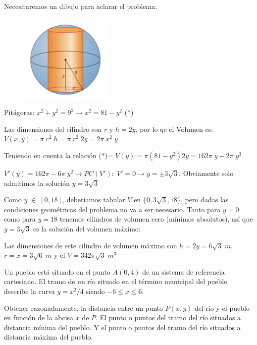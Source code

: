 	\begin{proofw}\renewcommand{\qedsymbol}{$\diamond$}	
		
		Necesitaremos un dibujo para aclarar el problema.

	
	\begin{multicols}{2}
		
		\begin{figure}[H]
			\centering
			\includegraphics[width=0.4\textwidth]{imagenes/imagenes05/T05IM29.png}
		\end{figure}
		
		Pitágoras: $x^2+y^2=9^2 \to x^2=81-y^2$ (*)
		
		Las dimensiones del cilindro son $r$ y $h=2y$, por lo qe el Volumen es: $V(x,y)=\pi\; r^2\; h = \pi \; r^2 \; 2y = 2\pi \ x^2 \; y$
		
		Teniendo en cuenta la relación (*)= $V(y)=\pi (81-y^2)2y=162\pi \; y - 2\pi \;y^3$
		
		$V'(y)=162\pi - 6\pi \; y^2 \to PC(V'):\; V'=0\to y=\pm 3\sqrt{3}$. Obviamente solo admitimos la solución $y=3\sqrt{3}$
	
	\end{multicols}
	
	Como $y\; \in \; [0,18]$, deberíamos tabular $V$ en $\{0, 3\sqrt{3}, 18\}$, pero dadas las condiciones geométricas del problema no va a ser necesario. Tanto para $y=0$ como para $y=18$ tenemos cilindros de volumen cero (mínimos absolutos), así que $y=3\sqrt{3}$ es la solución del volumen máximo:
	
	Las dimensiones de este cilindro de volumen máximo son $h=2y=6\sqrt{3} \; m$, $r=x=3\sqrt{6} \; m$ y el $V=342\pi \sqrt{3}\;  m^3$
		
	\end{proofw}

	\begin{ejre} Un pueblo está situado en el punto $A (0, 4)$ de un sistema de referencia cartesiano. El tramo de un río situado en el término municipal del pueblo describe la curva $y=x^2/4$ siendo $-6\le x \le 6.$
	 
Obtener razonadamente, la distancia entre un punto $P (x, y)$ 
del río y el pueblo en función de la abcisa $x$ de $P$. El punto o puntos del tramo del río situados a distancia mínima del pueblo. Y  el punto o puntos del tramo del río situados a distancia máxima del pueblo. 
	
	\end{ejre}
	
